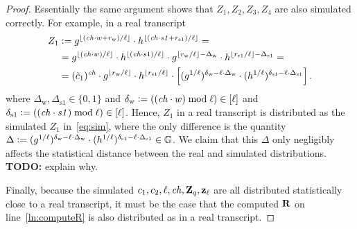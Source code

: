 \documentclass[11pt]{article}
\begin{document}
\begin{proof}
Essentially the same argument shows that $Z_1, Z_2, Z_3, Z_4$ are
also simulated correctly. 
For example, in a real transcript 
\begin{align*}
    Z_1 & \mathrel{\mathop:}= g^{\lfloor (\mathit{ch}\cdot w + r_\text{w}) / \ell \rfloor} \cdot 
             h^{\lfloor (\mathit{ch}\cdot \mathit{s1} + r_\text{s1}) / \ell \rfloor} = \\
       & =   g^{\lfloor (\mathit{ch}\cdot w) / \ell \rfloor} \cdot
             h^{\lfloor (\mathit{ch}\cdot s1) / \ell \rfloor} \cdot
             g^{\lfloor r_\text{w} / \ell \rfloor - \Delta_\text{w}} \cdot 
             h^{\lfloor r_\text{s1} / \ell \rfloor - \Delta_\text{s1}} =  \\
       & = (\tilde{c}_1)^\mathit{ch} \cdot
             g^{\lfloor r_\text{w} / \ell \rfloor} \cdot 
             h^{\lfloor r_\text{s1} / \ell \rfloor} \cdot 
             \left[ (g^{1/\ell})^{\delta_\text{w} - \ell \cdot \Delta_\text{w}} \cdot 
               (h^{1/\ell})^{\delta_\text{s1} - \ell \cdot \Delta_\text{s1}} \right].
\end{align*}
where $\Delta_\text{w}, \Delta_\text{s1} \in \{0,1\}$
and $\delta_\text{w} \mathrel{\mathop:}= ((\mathit{ch} \cdot w) \bmod \ell) \in [{\ell}]$
and $\delta_\text{s1} \mathrel{\mathop:}= ((\mathit{ch} \cdot \mathit{s1}) \bmod \ell) \in [{\ell}]$.
Hence, $Z_1$ in a real transcript is distributed as 
the simulated $Z_1$ in~\eqref{eq:sim}, where the only
difference is the quantity 
$\Delta \mathrel{\mathop:}= (g^{1/\ell})^{\delta_\text{w} - \ell \cdot \Delta_\text{w}} \cdot 
               (h^{1/\ell})^{\delta_\text{s1} - \ell \cdot \Delta_\text{s1}} \in \mathbb G$. 
We claim that this $\Delta$ only negligibly affects the statistical distance
between the real and simulated distributions. 
{\bf TODO:} explain why.

Finally, because the simulated $c_1, c_2, \ell, \mathit{ch}, \mathbf{Z}_q, \mathbf{z}_\ell$
are all distributed statistically close to a real transcript, 
it must be the case that the computed $\mathbf{R}$ 
on line~\eqref{ln:computeR} is also distributed as in 
a real transcript. 
\end{proof}
\end{document}
